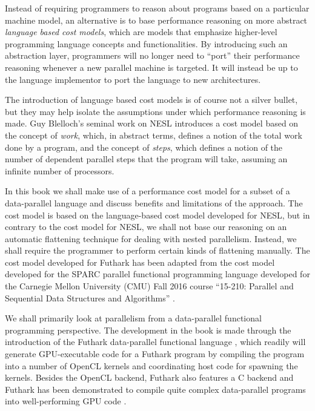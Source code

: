 \documentclass[oneside,11pt]{book}
\begin{document}
Instead of requiring programmers to reason about programs based on a
particular machine model, an alternative is to base performance
reasoning on more abstract \emph{language based cost models}, which
are models that emphasize higher-level programming language concepts and
functionalities. By introducing such an abstraction layer, programmers will
no longer need to ``port'' their performance reasoning whenever a new
parallel machine is targeted. It will instead be up to the language
implementor to port the language to new architectures.

The introduction of language based cost models is of course not a
silver bullet, but they may help isolate the assumptions under which
performance reasoning is made. Guy Blelloch's seminal work on NESL
\cite{blelloch1990vector,blelloch1994implementation} introduces a cost
model based on the concept of \emph{work}, which, in abstract terms,
defines a notion of the total work done by a program, and the concept
of \emph{steps}, which defines a notion of the number of dependent
parallel steps that the program will take, assuming an infinite number
of processors.

In this book we shall make use of a performance cost model for a
subset of a data-parallel language and discuss benefits and
limitations of the approach. The cost model is based on the
language-based cost model developed for NESL, but in contrary to the
cost model for NESL, we shall not base our reasoning on an automatic
flattening technique for dealing with nested parallelism. Instead, we
shall require the programmer to perform certain kinds of flattening
manually. The cost model developed for Futhark has been adapted from
the cost model developed for the SPARC parallel functional programming
language developed for the Carnegie Mellon University (CMU) Fall 2016
course ``15-210: Parallel and Sequential Data Structures and
Algorithms'' \cite{algdesign:parseq2016}.

We shall primarily look at parallelism from a data-parallel functional
programming perspective. The development in the book is made through
the introduction of the Futhark data-parallel functional language
\cite{henriksen2014size,henriksen2016design,henriksen2014bounds,henriksen2013t2},
which readily will generate GPU-executable code for a Futhark program
by compiling the program into a number of OpenCL kernels and
coordinating host code for spawning the kernels. Besides the OpenCL
backend, Futhark also features a C backend and Futhark has been
demonstrated to compile quite complex data-parallel programs into
well-performing GPU code \cite{finpar,apltofuthark2016}.
\end{document}
